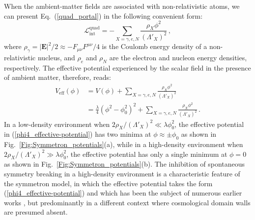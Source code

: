 \documentclass[aps,prd,onecolumn,nofootinbib]{revtex4-2} %
\renewcommand{\v}[1]{\boldsymbol{#1}}		%
\begin{document}
When the ambient-matter fields are associated with non-relativistic atoms, we can present Eq.~(\ref{quad_portal}) in the following convenient form: 
\begin{equation}
\label{quad_portal-atoms}
\mathcal{L}_\textrm{int}^\textrm{quad} = - \sum_{X=\gamma,e,N} \frac{\rho_X \phi^2}{\left( \Lambda'_X \right)^2}  \, , 
\end{equation}
where $\rho_\gamma = |\v{E}|^2/2 \approx -F_{\mu\nu}F^{\mu\nu}/4$ is the Coulomb energy density of a non-relativistic nucleus, and $\rho_e$ and $\rho_N$ are the electron and nucleon energy densities, respectively. 
The effective potential experienced by the scalar field in the presence of ambient matter, therefore, reads: 
\begin{align}
V_\textrm{eff} \left( \phi \right) &= V ( \phi ) + \sum_{X=\gamma,e,N} \frac{\rho_X \phi^2}{\left( \Lambda'_X \right)^2}  \label{effective-potential_generic} \\       
&= \frac{\lambda}{4} \left( \phi^2 - \phi_0^2 \right)^2 + \sum_{X=\gamma,e,N} \frac{\rho_X \phi^2}{\left( \Lambda'_X \right)^2}  \, .   \label{phi4_effective-potential}
\end{align}
In a low-density environment when $2 \rho_X / (\Lambda'_X)^2 \ll \lambda \phi_0^2$, the effective potential in (\ref{phi4_effective-potential}) has two minima at $\phi \approx \pm \phi_0$ as shown in Fig.~\ref{Fig:Symmetron_potentials}(a), while in a high-density environment when $2 \rho_X / (\Lambda'_X)^2 \gg \lambda \phi_0^2$, the effective potential has only a single minimum at $\phi = 0$ as shown in Fig.~\ref{Fig:Symmetron_potentials}(b). 
The inhibition of spontaneous symmetry breaking in a high-density environment is a characteristic feature of the symmetron model, in which the effective potential takes the form (\ref{phi4_effective-potential}) and which has been the subject of numerous earlier works \cite{Pietroni_2005-symmetron,Olive-Pospelov_2008-FCs+symmetron,Khoury_2010-symmetron,Updahye_2013-symmetron,Khoury_2011-symmetron,Jaffe_2017-symmetron,Abele_2018-symmetron,Burrage_2018-symmetron,Brax-Fichet_2019-symmetron,Vardanyan_2019-symmetron}, but predominantly in a different context where cosmological domain walls are presumed absent. 
\end{document}
